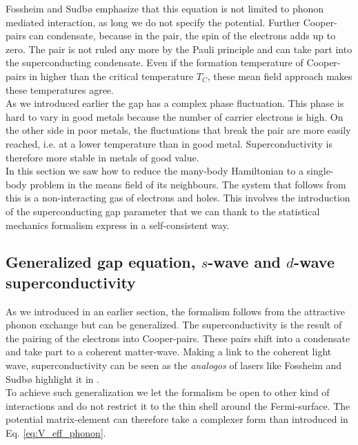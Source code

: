 \documentclass[../main.tex]{subfile}
\begin{document}
Fossheim and Sudbø \cite{FossheimSudbo2004} emphasize that this equation is not limited to phonon mediated interaction, as long we
do not specify the potential. Further Cooper-pairs can condensate, because in the pair, the spin of the electrons adds up to zero.
The pair is not ruled any more by the Pauli principle and can take part into the superconducting condensate.
Even if the formation temperature of Cooper-pairs in higher than the critical temperature $T_C$, these mean field approach makes these temperatures agree.\\

As we introduced earlier the gap has a complex phase fluctuation. This phase is hard to vary in good metals because the number of carrier electrons is high.
On the other side in poor metals, the fluctuations that break the pair are more easily reached, i.e. at a lower temperature than in good metal. Superconductivity
is therefore more stable in metals of good value.\\

In this section we saw how to reduce the many-body Hamiltonian to a single-body problem in the means field of its neighbours. The system that follows from this
is a non-interacting gas of electrons and holes. This involves the introduction of the 
superconducting gap parameter that we can thank to the statistical mechanics formalism express in a self-consistent way.


\subsection{Generalized gap equation, $s$-wave and $d$-wave superconductivity}
As we introduced in an earlier section, the formalism follows from the attractive phonon exchange but can be generalized. The superconductivity
is the result of the pairing of the electrons into Cooper-pairs. These pairs shift into a condensate and take part to a coherent matter-wave.
Making a link to the coherent light wave, superconductivity can be seen as the \textit{analogos} of lasers like Fossheim and Sudbø 
highlight it in \cite{FossheimSudbo2004}.\\

To achieve such generalization we let the formalism be open to other kind of interactions and do not restrict it to the thin shell around the Fermi-surface.
The potential matrix-element can therefore take a complexer form than introduced in Eq. \ref{eq:V_eff_phonon}.\\
\end{document}
